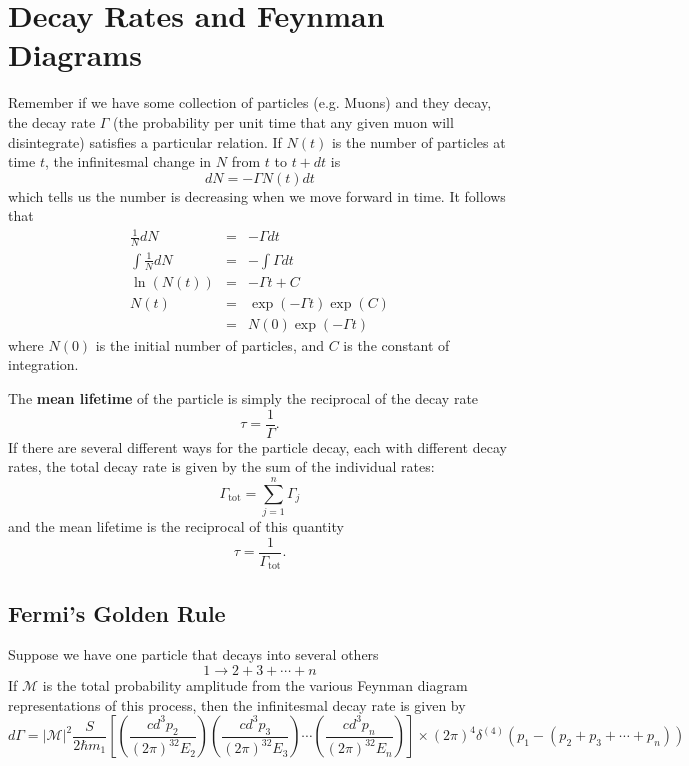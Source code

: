 \section{Decay Rates and Feynman Diagrams}

Remember if we have some collection of particles (e.g. Muons) and they decay,
the decay rate $\Gamma$ (the probability per unit time that any given muon will
disintegrate) satisfies a particular relation. If $N(t)$ is the number of particles
at time $t$, the infinitesmal change in $N$ from $t$ to $t+dt$ is
\begin{equation}
dN = -\Gamma N(t)dt
\end{equation}
which tells us the number is decreasing when we move forward in time. It follows
that
\begin{eqnarray*}
\frac{1}{N}dN &=& -\Gamma dt\\
\int\frac{1}{N}dN &=& -\int\Gamma dt\\
\ln(N(t)) &=& -\Gamma t + C \\
N(t) &=& \exp(-\Gamma t)\exp(C) \\
&=& N(0)\exp(-\Gamma t)
\end{eqnarray*}
where $N(0)$ is the initial number of particles, and $C$ is the constant of
integration. 

The \textbf{mean lifetime} of the particle is simply the reciprocal of the 
decay rate
\begin{equation}
\tau = \frac{1}{\Gamma}.
\end{equation}
If there are several different ways for the particle decay, each with different
decay rates, the total decay rate is given by the sum of the individual rates:
\begin{equation}
\Gamma_\textrm{tot} = \sum_{j=1}^{n} \Gamma_{j}
\end{equation}
and the mean lifetime is the reciprocal of this quantity
\begin{equation}
\tau = \frac{1}{\Gamma_\textrm{tot}}.
\end{equation}

\subsection{Fermi's Golden Rule}

Suppose we have one particle that decays into several others
\begin{equation}
1\to 2+3+\cdots+n
\end{equation}
If $\mathcal{M}$ is the total probability amplitude from the various Feynman
diagram representations of this process, then the infinitesmal decay rate is
given by
\begin{equation}
d\Gamma = |\mathcal{M}|^2 \frac{S}{2\hbar m_1}\left[\left(\frac{cd^3p_2}{(2\pi)^32E_2}\right)\left(\frac{cd^3p_3}{(2\pi)^32E_3}\right) \cdots \left(\frac{cd^3p_n}{(2\pi)^32E_n}\right) \right]\times (2\pi)^4 \delta^{(4)}(p_1 - (p_2 + p_3 + \cdots + p_n))
\end{equation}
